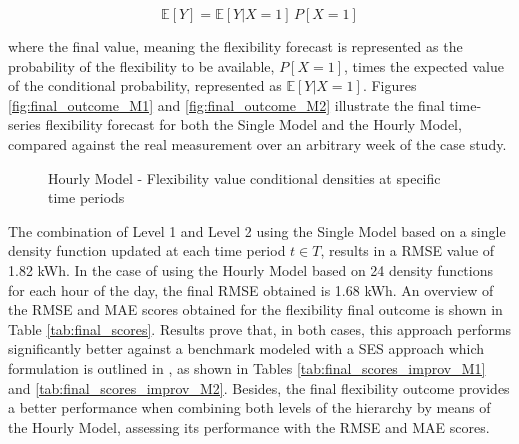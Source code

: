 \begin{equation}
  \mathbb{E}[Y] = \mathbb{E}[Y|X=1] \,  P[X=1]
\end{equation}

where the final value, meaning the flexibility forecast is represented as the probability of the flexibility to be available, $ P[X=1]$,  times the expected value of the conditional probability, represented as $\mathbb{E}[Y|X=1]$. Figures \ref{fig:final_outcome_M1} and \ref{fig:final_outcome_M2} illustrate the final time-series flexibility forecast for both the Single Model and the Hourly Model, compared against the real measurement over an arbitrary week of the case study.



\begin{figure}[htbp]
\centering    
{}
\caption{Hourly Model - Flexibility value conditional densities at specific time periods}
\label{fig:conditional_densities_2}
\end{figure}


The combination of Level 1 and Level 2 using the Single Model based on a single density function updated at each time period $t \in T$, results in a RMSE value of 1.82 kWh. In the case of using the Hourly Model based on 24 density functions for each hour of the day, the final RMSE obtained is 1.68 kWh. An overview of the RMSE and MAE scores obtained for the flexibility final outcome is shown in Table \ref{tab:final_scores}. Results prove that, in both cases, this approach performs significantly better against a benchmark modeled with a SES approach which formulation is outlined in \cite{Hyndman2021}, as shown in Tables \ref{tab:final_scores_improv_M1} and  \ref{tab:final_scores_improv_M2}. 
Besides, the final flexibility outcome provides a better performance when combining both levels of the hierarchy by means of the Hourly Model, assessing its performance with the RMSE and MAE scores. 

